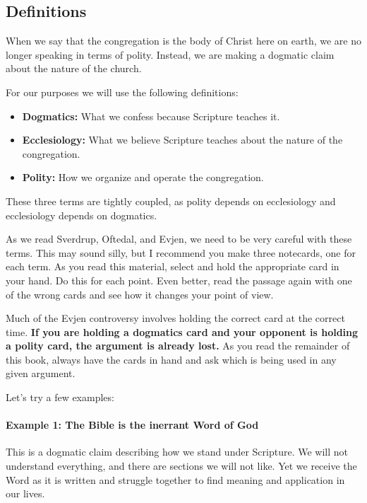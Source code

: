 

\subsection{Definitions}

When we say that the congregation is the body of Christ here on earth, we are no longer speaking in terms of polity. Instead, we are making a dogmatic claim about the nature of the church.

For our purposes we will use the following definitions:

\begin{itemize}
    \item \textbf{Dogmatics:} What we confess because Scripture teaches it.

    \item \textbf{Ecclesiology:} What we believe Scripture teaches about the nature of the congregation.

    \item \textbf{Polity:} How we organize and operate the congregation. 
\end{itemize}

These three terms are tightly coupled, as polity depends on ecclesiology and ecclesiology depends on dogmatics. 

As we read Sverdrup, Oftedal, and Evjen, we need to be very careful with these terms. This may sound silly, but I recommend you make three notecards, one for each term. As you read this material, select and hold the appropriate card in your hand. Do this for each point. Even better, read the passage again with one of the wrong cards and see how it changes your point of view.

Much of the Evjen controversy involves holding the correct card at the correct time. \textbf{If you are holding a dogmatics card and your opponent is holding a polity card, the argument is already lost.} As you read the remainder of this book, always have the cards in hand and ask which is being used in any given argument.    

Let's try a few examples:

\paragraph{Example 1: The Bible is the inerrant Word of God} 

This is a dogmatic claim describing how we stand under Scripture. We will not understand everything, and there are sections we will not like. Yet we receive the Word as it is written and struggle together to find meaning and application in our lives.
 

